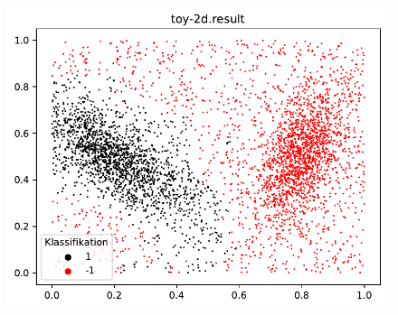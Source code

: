 \documentclass{beamer}
\begin{document}
\begin{figure}[h]
\centering
\includegraphics[scale=0.7]{toy-2d-result.pdf}
\label{bananas}
\end{figure}

\begin{frame}
\vspace{20mm}
\end{frame}
\end{document}
